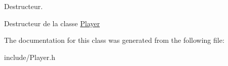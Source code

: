Destructeur. 

Destructeur de la classe \hyperlink{classPlayer}{Player} 

The documentation for this class was generated from the following file\-:\begin{DoxyCompactItemize}
\item 
include/Player.\-h\end{DoxyCompactItemize}
